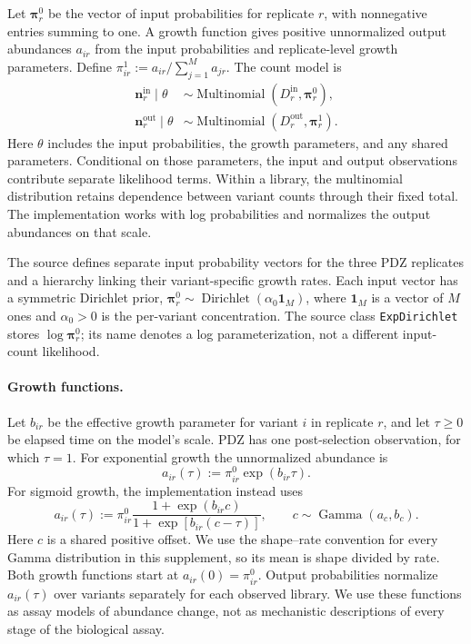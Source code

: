 Let $\boldsymbol\pi_r^0$ be the vector of input probabilities for replicate
$r$, with nonnegative entries summing to one. A growth function gives positive
unnormalized output abundances $a_{ir}$ from the input probabilities and
replicate-level growth parameters. Define
$\pi_{ir}^1:=a_{ir}/\sum_{j=1}^M a_{jr}$. The count model is
\begin{align}
\mathbf n_r^{\mathrm{in}}\mid\theta
&\sim\operatorname{Multinomial}(D_r^{\mathrm{in}},\boldsymbol\pi_r^0),\\
\mathbf n_r^{\mathrm{out}}\mid\theta
&\sim\operatorname{Multinomial}(D_r^{\mathrm{out}},\boldsymbol\pi_r^1).
\end{align}
Here $\theta$ includes the input probabilities, the growth parameters, and
any shared parameters. Conditional on those parameters, the input and output
observations contribute separate likelihood terms. Within a library, the
multinomial distribution retains dependence between variant counts through
their fixed total. The implementation works with log probabilities and
normalizes the output abundances on that scale.

The source defines separate input probability vectors for the three PDZ
replicates and a hierarchy linking their variant-specific growth rates.
Each input vector has a symmetric Dirichlet prior,
$\boldsymbol\pi_r^0\sim\operatorname{Dirichlet}(\alpha_0\mathbf1_M)$,
where $\mathbf1_M$ is a vector of $M$ ones and $\alpha_0>0$ is the
per-variant concentration. The source class \texttt{ExpDirichlet} stores
$\log\boldsymbol\pi_r^0$; its name denotes a log parameterization, not a
different input-count likelihood.

\paragraph{Growth functions.}
Let $b_{ir}$ be the effective growth parameter for variant $i$ in replicate
$r$, and let $\tau\geq0$ be elapsed time on the model's scale. PDZ has one
post-selection observation, for which $\tau=1$. For exponential growth the
unnormalized abundance is
\[
a_{ir}(\tau):=\pi_{ir}^0\exp(b_{ir}\tau).
\]
For sigmoid growth, the implementation instead uses
\[
a_{ir}(\tau):=\pi_{ir}^0
\frac{1+\exp(b_{ir}c)}{1+\exp[b_{ir}(c-\tau)]},
\qquad c\sim\operatorname{Gamma}(a_c,b_c).
\]
Here $c$ is a shared positive offset. We use the shape--rate convention
for every Gamma distribution in this supplement, so its mean is shape
divided by rate. Both growth functions start at $a_{ir}(0)=\pi_{ir}^0$.
Output probabilities normalize $a_{ir}(\tau)$ over variants separately
for each observed library. We use these functions as assay models of abundance
change, not as mechanistic descriptions of every stage of the biological assay.

